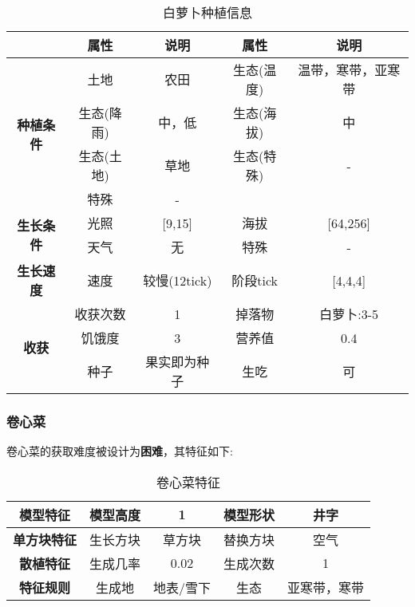 \begin{table}[H]
    \centering
    \caption{白萝卜种植信息}
    \label{table:白萝卜种植信息}
    \setlength{\tabcolsep}{4mm}
    \begin{tabular}{c|cc|cc}
        \toprule
                                           & \textbf{属性} & \textbf{说明} & \textbf{属性} & \textbf{说明} \\
        \midrule
        \multirow{4}{*}{\textbf{种植条件}} & 土地          & 农田          & 生态(温度)    & 温带，寒带，亚寒带    \\
                                           & 生态(降雨)    & 中，低        & 生态(海拔)    & 中            \\
                                           & 生态(土地)    & 草地          & 生态(特殊)    & -             \\
                                           & 特殊          & -         \\
        \midrule
        \multirow{2}{*}{\textbf{生长条件}} & 光照          & [9,15]        & 海拔          & [64,256]      \\
                                           & 天气          & 无           & 特殊          & -             \\
        \midrule
        \textbf{生长速度}                  & 速度          & 较慢(12tick)     & 阶段tick      & [4,4,4]       \\
        \midrule
        \multirow{3}{*}{\textbf{收获}}     & 收获次数      & 1             & 掉落物        & 白萝卜:3-5      \\
                                           & 饥饿度        & 3             & 营养值        & 0.4           \\
                                           & 种子          & 果实即为种子  & 生吃          & 可 \\
        \bottomrule
    \end{tabular}
\end{table}

\subsubsection{卷心菜}

卷心菜的获取难度被设计为\textbf{困难}，其特征如下:
\begin{table}[H]
    \centering
    \caption{卷心菜特征}
    \label{table:卷心菜特征}
    \setlength{\tabcolsep}{4mm}
    \begin{tabular}{c|cc|cc}
        \toprule
        \textbf{模型特征}   & 模型高度 & 1      & 模型形状 & 井字     \\
        \midrule
        \textbf{单方块特征} & 生长方块 & 草方块 & 替换方块 & 空气     \\
        \midrule
        \textbf{散植特征}   & 生成几率 & 0.02   & 生成次数 & 1        \\
        \midrule
        \textbf{特征规则}   & 生成地   & 地表/雪下   & 生态     & 亚寒带，寒带 \\
        \bottomrule
    \end{tabular}
\end{table}


